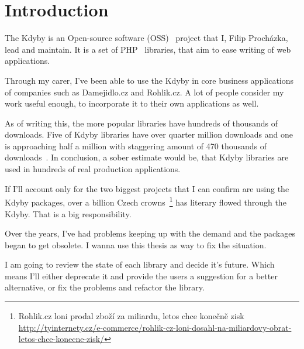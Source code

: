 \chapter{Introduction}

The Kdyby is an Open-source software (OSS)~\cite{wiki:oss} project that I, Filip Procházka, lead and maintain. It is a set of PHP~\cite{wiki:php} libraries, that aim to ease writing of web applications.

Through my carer, I've been able to use the Kdyby in core business applications of companies such as Damejidlo.cz and Rohlik.cz. A lot of people consider my work useful enough, to incorporate it to their own applications as well.

As of writing this, the more popular libraries have hundreds of thousands of downloads. Five of Kdyby libraries have over quarter million downloads and one is approaching half a million with staggering amount of 470 thousands of downloads~\cite{packagist:kdyby}. In conclusion, a sober estimate would be, that Kdyby libraries are used in hundreds of real production applications.

If I'll account only for the two biggest projects that I can confirm are using the Kdyby packages, over a billion Czech crowns~\footnote{Rohlik.cz loni prodal zboží za miliardu, letos chce konečně zisk \\\url{http://tyinternety.cz/e-commerce/rohlik-cz-loni-dosahl-na-miliardovy-obrat-letos-chce-konecne-zisk/}} has literary flowed through the Kdyby. That is a big responsibility.

Over the years, I've had problems keeping up with the demand and the packages began to get obsolete. I wanna use this thesis as way to fix the situation.

I am going to review the state of each library and decide it's future. Which means I'll either deprecate it and provide the users a suggestion for a better alternative, or fix the problems and refactor the library.
